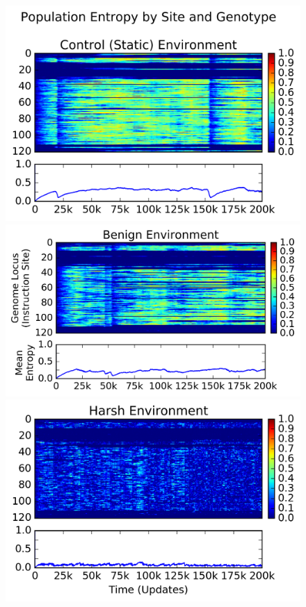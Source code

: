 \documentclass[letterpaper]{article}
\begin{document}
\begin{figure}[h!]
\begin{center}
\includegraphics[trim={-0.85cm 0 0.1cm 0.2cm},clip,width=1\columnwidth]{figures/control__entropy}
\includegraphics[trim={0.25cm 0 0.1cm 0},clip,width=1\columnwidth]{figures/benign__entropy}
\includegraphics[trim={-0.85cm 0 0.1cm 0},clip,width=1\columnwidth]{figures/harsh__entropy}

\end{center}
\end{figure}
\end{document}
